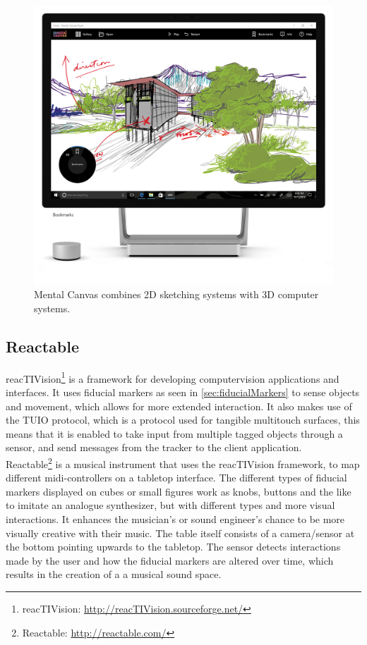 				\begin{figure}[H]
					\centering
					\includegraphics[width=0.5\linewidth]{figure/Analysis/mentalCanvas.png}
					\caption{Mental Canvas combines 2D sketching systems with 3D computer systems.}
					\label{fig:mentalCanvas}
				\end{figure}

		\subsection{Reactable}
			reacTIVision\footnote{reacTIVision: \url{http://reacTIVision.sourceforge.net/}} is a framework for developing computervision applications and interfaces. It uses fiducial markers as seen in  \autoref{sec:fiducialMarkers} to sense objects and movement, which allows for more extended interaction. It also makes use of the TUIO protocol, which is a protocol used for tangible multitouch surfaces, this means that it is enabled to take input from multiple tagged objects through a sensor, and send messages from the tracker to the client application. \\
			
			Reactable\footnote{Reactable: \url{http://reactable.com/}} is a musical instrument that uses the reacTIVision framework, to map different midi-controllers on a tabletop interface. The different types of fiducial markers displayed on cubes or small figures work as knobs, buttons and the like to imitate an analogue synthesizer, but with different types and more visual interactions. It enhances the musician's or sound engineer's chance to be more visually creative with their music. The table itself consists of a camera/sensor at the bottom pointing upwards to the tabletop. The sensor detects interactions made by the user and how the fiducial markers are altered over time, which results in the creation of a a musical sound space.
				
